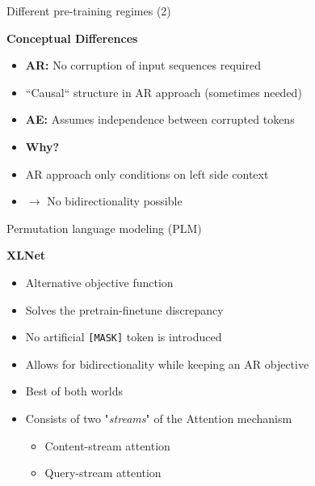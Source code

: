 
\begin{frame}{Different pre-training regimes (2)}

\vfill
	
	\textbf{Conceptual Differences}
	
	\begin{itemize}
		\item \textbf{AR:} No corruption of input sequences required
		\item ``Causal`` structure in AR approach (sometimes needed)
		\item \textbf{AE:} Assumes independence between corrupted tokens
		\item[] \ques \textbf{Why?}
		\item AR approach only conditions on left side context
		\item[] $\to$ No bidirectionality possible
	\end{itemize}
	
\vfill

\end{frame}


\begin{frame}{Permutation language modeling (PLM)}

\vfill

	\textbf{XLNet} 
	
	\begin{itemize}
		\item Alternative objective function
		\item Solves the pretrain-finetune discrepancy
		\item[$\to$] No artificial \texttt{[MASK]} token is introduced
		\item Allows for bidirectionality while keeping an AR objective
		\item[$\to$] Best of both worlds
		\item Consists of two "\textit{streams}" of the Attention mechanism
				\begin{itemize}
					\item Content-stream attention
					\item Query-stream attention
				\end{itemize}
	\end{itemize}
	
\vfill

\end{frame}

